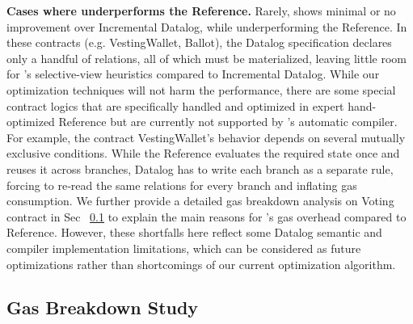 \noindent \textbf{Cases where \proto underperforms the Reference.}
Rarely, \proto shows minimal or no improvement over {\sf Incremental Datalog}, while underperforming the {\sf Reference}.
In these contracts (e.g. \textsf{VestingWallet, Ballot}), the Datalog specification declares only a handful of relations, all of which must be materialized, leaving little room for \proto’s selective‑view heuristics compared to {\sf Incremental Datalog}.  
While our optimization techniques will not harm the performance, there are some special contract logics that are specifically handled and optimized in expert hand-optimized {\sf Reference} but are currently not supported by \proto's automatic compiler.
For example, the contract \textsf{VestingWallet}'s behavior depends on several mutually exclusive conditions. While the {\sf Reference} evaluates the required state once and reuses it across branches, Datalog has to write each branch as a separate rule, forcing \proto to re‑read the same relations for every branch and inflating gas consumption. 
We further provide a detailed gas breakdown analysis on {\sf Voting} contract in Sec ~\ref{ssec:gas-breakdown} to explain the main reasons for \proto's gas overhead compared to {\sf Reference}.
However, these shortfalls here reflect some Datalog semantic and compiler implementation limitations, which can be considered as future optimizations rather than shortcomings of our current optimization algorithm.



\subsection{Gas Breakdown Study} 
\label{ssec:gas-breakdown}


